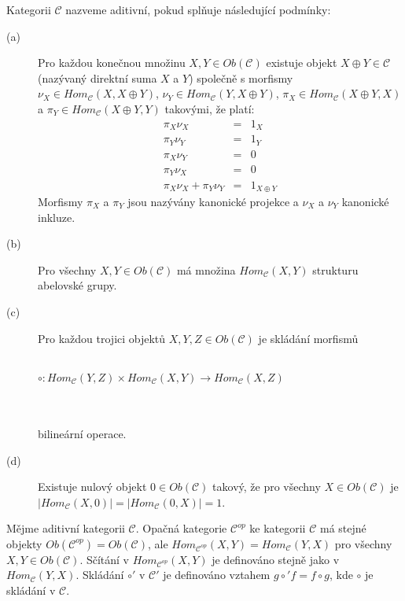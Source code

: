       \begin{dfn}
        Kategorii $\mathcal C$ nazveme aditivní, pokud splňuje následující 
        podmínky:
        \begin{description}
          \item[(a)] Pro každou konečnou množinu $X,Y\in Ob(\mathcal C)$ 
          existuje objekt $X\oplus Y\in \mathcal C$ (nazývaný direktní suma $X$ 
          a $Y$) společně s morfismy 
          $\nu_X\in Hom_{\mathcal C}(X,X\oplus Y)$, 
          $\nu_Y\in Hom_{\mathcal C}(Y,X\oplus Y)$,
          $\pi_X\in Hom_{\mathcal C}(X\oplus Y,X)$ a 
          $\pi_Y\in Hom_{\mathcal C}(X\oplus Y,Y)$ takovými, že platí:          
          \begin{eqnarray}
            \pi_X\nu_X &=& 1_X \nonumber \\
            \pi_Y\nu_Y  &=& 1_Y \nonumber \\
            \pi_X\nu_Y &=& 0 \nonumber \\
            \pi_Y\nu_X &=& 0 \nonumber \\
             \pi_X\nu_X + \pi_Y\nu_Y &=& 1_{X\oplus Y} \nonumber 
          \end{eqnarray}
          Morfismy $\pi_X$ a $\pi_Y$ jsou nazývány kanonické projekce a $\nu_X$ 
          a $\nu_Y$ kanonické inkluze.
          
          \item[(b)] Pro všechny $X,Y\in Ob(\mathcal C)$ má množina $Hom_{\mathcal C}(X,Y)$ 
          strukturu abelovské grupy.
          \item[(c)] Pro každou trojici objektů $X,Y,Z\in Ob(\mathcal C)$ je 
          skládání morfismů \\\\
          \centerline{$\circ:Hom_{\mathcal C}(Y,Z)\times Hom_{\mathcal C}(X,Y)\longrightarrow Hom_{\mathcal C}(X,Z)$} 
          \\\\ bilineární operace.
          \item[(d)] Existuje nulový objekt $0\in Ob(\mathcal C)$ takový, že pro 
          všechny $X\in Ob(\mathcal C)$ je $| Hom_{\mathcal C}(X,0)|=| Hom_{\mathcal 
          C}(0,X)|=1$.
        \end{description}
      \end{dfn}
      
      \begin{dfn}
        Mějme aditivní kategorii $\mathcal C$. Opačná kategorie $\mathcal C^{op}$ 
        ke kategorii $\mathcal C$ má stejné objekty $Ob(\mathcal C^{op})=Ob(\mathcal C)$, 
        ale 
        $Hom_{\mathcal C^{op}}(X,Y)=Hom_{\mathcal C}(Y,X)$ pro všechny 
        $X,Y\in Ob(\mathcal C)$. Sčítání v $Hom_{\mathcal C^{op}}(X,Y)$ je definováno stejně jako
        v $Hom_{\mathcal C}(Y,X)$. Skládání $\circ'$ v $\mathcal C'$ je 
        definováno vztahem $g\circ' f=f\circ g$, kde $\circ$ je skládání v $\mathcal 
        C$.
      \end{dfn}
    
